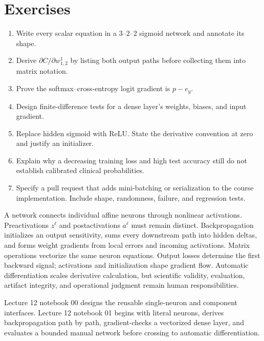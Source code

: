 \section{Exercises}
\begin{enumerate}
  \item Write every scalar equation in a $3$--$2$--$2$ sigmoid network and
  annotate its shape.
  \item Derive $\partial C/\partial w_{1,2}^1$ by listing both output paths
  before collecting them into matrix notation.
  \item Prove the softmax--cross-entropy logit gradient is $p-e_y$.
  \item Design finite-difference tests for a dense layer's weights, biases, and
  input gradient.
  \item Replace hidden sigmoid with ReLU. State the derivative convention at
  zero and justify an initializer.
  \item Explain why a decreasing training loss and high test accuracy still do
  not establish calibrated clinical probabilities.
  \item Specify a pull request that adds mini-batching or serialization to the
  course implementation. Include shape, randomness, failure, and regression
  tests.
\end{enumerate}

\begin{chapterreview}
A network connects individual affine neurons through nonlinear activations.
Preactivations $z^\ell$ and postactivations $a^\ell$ must remain distinct.
Backpropagation initializes an output sensitivity, sums every downstream path
into hidden deltas, and forms weight gradients from local errors and incoming
activations. Matrix operations vectorize the same neuron equations. Output
losses determine the first backward signal; activations and initialization
shape gradient flow. Automatic differentiation scales derivative calculation,
but scientific validity, evaluation, artifact integrity, and operational
judgment remain human responsibilities.
\end{chapterreview}

\begin{notebooklink}
Lecture 12 notebook 00 designs the reusable single-neuron and component
interfaces. Lecture 12 notebook 01 begins with literal neurons, derives
backpropagation path by path, gradient-checks a vectorized dense layer, and
evaluates a bounded manual network before crossing to automatic differentiation.
\end{notebooklink}
